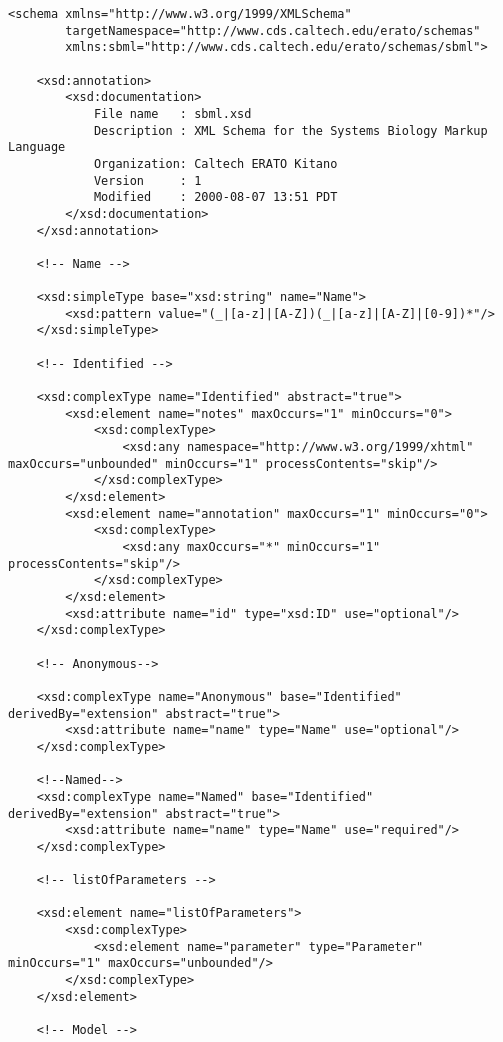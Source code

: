 \documentclass[10pt]{article}
\newcommand{\tightspacing}{\renewcommand{\baselinestretch}{0.85}}
\begin{document}
\begin{small}
\tightspacing
\begin{verbatim}
<schema xmlns="http://www.w3.org/1999/XMLSchema"
        targetNamespace="http://www.cds.caltech.edu/erato/schemas"
        xmlns:sbml="http://www.cds.caltech.edu/erato/schemas/sbml">

    <xsd:annotation>
        <xsd:documentation>
            File name   : sbml.xsd
            Description : XML Schema for the Systems Biology Markup Language
            Organization: Caltech ERATO Kitano
            Version     : 1
            Modified    : 2000-08-07 13:51 PDT
        </xsd:documentation>
    </xsd:annotation>

    <!-- Name -->

    <xsd:simpleType base="xsd:string" name="Name">
        <xsd:pattern value="(_|[a-z]|[A-Z])(_|[a-z]|[A-Z]|[0-9])*"/>
    </xsd:simpleType>

    <!-- Identified -->

    <xsd:complexType name="Identified" abstract="true">
        <xsd:element name="notes" maxOccurs="1" minOccurs="0">
            <xsd:complexType>
                <xsd:any namespace="http://www.w3.org/1999/xhtml" maxOccurs="unbounded" minOccurs="1" processContents="skip"/>
            </xsd:complexType>
        </xsd:element>
        <xsd:element name="annotation" maxOccurs="1" minOccurs="0">
            <xsd:complexType>
                <xsd:any maxOccurs="*" minOccurs="1" processContents="skip"/>
            </xsd:complexType>
        </xsd:element>
        <xsd:attribute name="id" type="xsd:ID" use="optional"/>
    </xsd:complexType>

    <!-- Anonymous-->

    <xsd:complexType name="Anonymous" base="Identified" derivedBy="extension" abstract="true">
        <xsd:attribute name="name" type="Name" use="optional"/>
    </xsd:complexType>

    <!--Named-->
    <xsd:complexType name="Named" base="Identified" derivedBy="extension" abstract="true">
        <xsd:attribute name="name" type="Name" use="required"/>
    </xsd:complexType>

    <!-- listOfParameters -->

    <xsd:element name="listOfParameters">
        <xsd:complexType>
            <xsd:element name="parameter" type="Parameter" minOccurs="1" maxOccurs="unbounded"/>
        </xsd:complexType>
    </xsd:element>

    <!-- Model -->


\end{verbatim}
\end{small}
\end{document}
